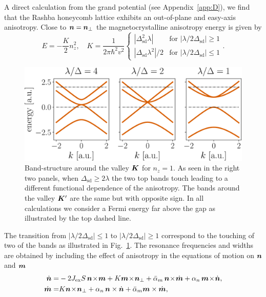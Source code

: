 A direct calculation from the grand potential (see Appendix~\ref{app:D}), we find that the Rashba honeycomb lattice exhibits an out-of-plane and easy-axis anisotropy. Close to $\boldsymbol{n}=\boldsymbol{n}_\perp$ the magnetocrystalline anisotropy energy is given by
\begin{equation}
    E = -\frac{K}{2}n_z^2, \quad K= \frac{1}{2\pi\hbar^2v^2}\begin{cases}
    |\Delta_\text{sd}^2\lambda|  &  \text{for } |\lambda/2\Delta_\text{sd}| \geq 1 \\
    |\Delta_\text{sd}\lambda^2|/2  &  \text{for } |\lambda/2\Delta_\text{sd}| \leq 1
    \end{cases}.
\end{equation}
\begin{figure}
    \centering
    \includegraphics[width=0.75\linewidth]{gfx/fig2_new.pdf}
    \caption{Band-structure around the valley $\boldsymbol{K}$ for $n_z=1$. As seen in the right two panels, when $\Delta_\text{sd}\geq2\lambda$ the two top bands touch leading to a different functional dependence of the anisotropy. The bands around the valley $\boldsymbol{K}'$ are the same but with opposite sign. In all calculations we consider a Fermi energy far above the gap as illustrated by the top dashed line.  }
    \label{fig:bands}
\end{figure}
The transition from $|\lambda/2\Delta_\text{sd}|\le1$ to $|\lambda/2\Delta_\text{sd}|\ge1$ correspond to the touching of two of the bands as illustrated in Fig.~\ref{fig:bands}. The resonance frequencies and widths are obtained by including the effect of anisotropy in the equations of motion on $\boldsymbol{n}$ and $\boldsymbol{m}$
\beml
\label{AFMEOM2}
\begin{align}
\label{ndot2}
\dot{\bb{n}} = &  -2J_\text{ex}S\, \bb{n}\!\times\!\bb{m} +K \bb{m}\!\times\!\bb{n}_\perp+\bar{\alpha}_m\,\bb{n}\!\times\!\dot{\bb{m}}+\alpha_n\,\bb{m}\!\times\! \dot{\bb{n}},\\
\label{mdot2}
\dot{\bb{m}} = & K  \bb{n}\!\times\!\bb{n}_\perp+\alpha_n\,\bb{n} \times \dot{\bb{n}}+\bar{\alpha}_m \bb{m} \times \dot{\bb{m}} ,
\end{align}
